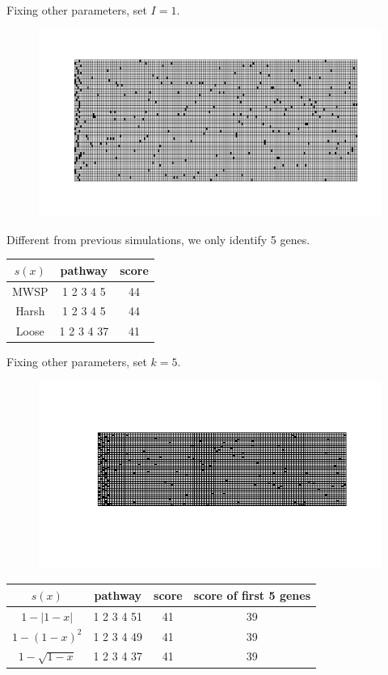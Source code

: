 \documentclass[xcolor=dvipsnames]{beamer}
\begin{document}
\begin{frame}
Fixing other parameters, set $I=1$.\\
\begin{figure}
\centering
\includegraphics[width=0.8\linewidth]{recent.png}
\end{figure}
\end{frame}
\begin{frame}
Different from previous simulations, we only identify 5 genes.
\begin{table}
\centering
\begin{tabular}{c|c|c}
\hline
$s(x)$&pathway&score\\
\hline
MWSP&  1 2  3   4  5 &44\\
Harsh&1 2 3 4 5&44\\
Loose&1 2 3 4 37&41\\
\end{tabular}
\end{table}
\end{frame}
\begin{frame}
Fixing other parameters, set $k=5$.\\
\begin{figure}
\centering
\includegraphics[width=0.8\linewidth]{newmut.png}
\end{figure}
\end{frame}
\begin{frame}
\begin{table}
\centering
\begin{tabular}{c|c|c|c}
\hline
$s(x)$&pathway&score&score of first 5 genes\\
\hline
$1-|1-x|$&  1 2  3   4  51 &41&39\\
$1-(1-x)^2$&1 2 3 4 49&41&39\\
$1-\sqrt{1-x}$&1 2 3 4 37&41&39\\
\end{tabular}
\end{table}
\end{frame}
\end{document}
